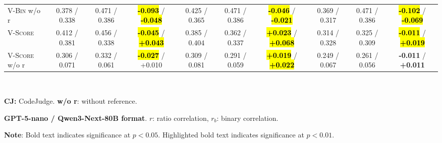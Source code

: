 \begin{table}[t]
\begin{tabular}{@{}
        l|ccc|ccc|ccc@{}}
        \textsc{V-Bin} w/o r    & 0.378 / 0.338   & 0.471 / 0.386   & \hl{\textbf{-0.093}} / \hl{\textbf{-0.048}} & 0.425 / 0.365   & 0.471 / 0.386   & \hl{\textbf{-0.046}} / \hl{\textbf{-0.021}} & 0.369 / 0.317   & 0.471 / 0.386   & \hl{\textbf{-0.102}} / \hl{\textbf{-0.069}} \\
        \textsc{V-Score}        & 0.412 / 0.381   & 0.456 / 0.338   & \hl{\textbf{-0.045}} / \hl{\textbf{+0.043}} & 0.385 / 0.404   & 0.362 / 0.337   & \hl{\textbf{+0.023}} / \hl{\textbf{+0.068}} & 0.314 / 0.328   & 0.325 / 0.309   & \hl{\textbf{-0.011}} / \hl{\textbf{+0.019}} \\
        \textsc{V-Score} w/o r  & 0.306 / 0.071   & 0.332 / 0.061   & \hl{\textbf{-0.027}} / +0.010       & 0.309 / 0.081   & 0.291 / 0.059   & \hl{\textbf{+0.019}} / \hl{\textbf{+0.022}} & 0.249 / 0.067   & 0.261 / 0.056   & \textbf{-0.011} / \textbf{+0.011}   \\
        \bottomrule
    \end{tabular}\\
    \begin{description}[itemsep=-3pt,topsep=0pt]
        \item \textbf{CJ:} CodeJudge. \hspace{10pt} \textbf{w/o r}: without reference.
        \item \textbf{GPT-5-nano / Qwen3-Next-80B format}. $r$: ratio correlation, $r_b$: binary correlation.
        \item \textbf{Note}: Bold text indicates significance at $p < 0.05$. Highlighted bold text indicates significance at $p < 0.01$.
    \end{description}
\end{table}